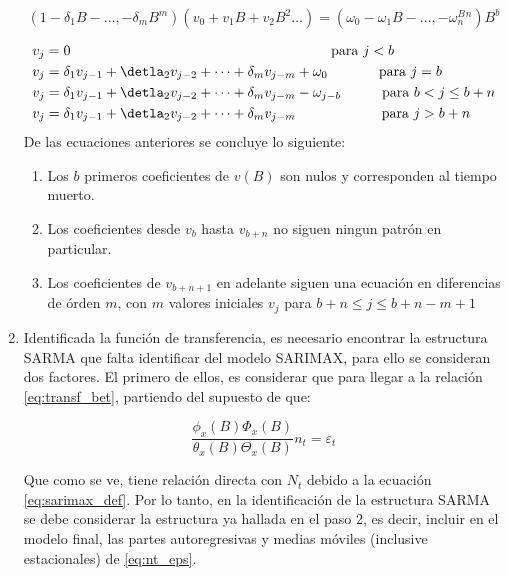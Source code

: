 \documentclass[12pt,oneside]{book}\usepackage[]{graphicx}\usepackage[]{color}
\theoremstyle{definition} %
\begin{document}
\begin{enumerate}
$$(1-\delta_1B-\dots,-\delta_mB^m) (v_0+v_1B+v_2B^2\dots)= (\omega_0-\omega_1B-\dots,-\omega_n^B^n)B^b$$

\begin{equation} 
\begin{split}
v_j & = 0  \text{ \phantom{aaaaaaaaaaaaaaaaaaaaaaaaaaaaaaaaaaaa} para } j<b\\
v_j & = \delta_1v_{j-1}+\detla_2 v_{j-2} + \dots +\delta_m v_{j-m} + \omega_0  \text{ \phantom{aaaaaa} para } j=b\\
v_j & = \delta_1v_{j-1}+\detla_2 v_{j-2} + \dots +\delta_m v_{j-m} - \omega_{j-b}  \text{ \phantom{aaaa.} para } b < j\leq b+n\\
v_j & = \delta_1v_{j-1}+\detla_2 v_{j-2} + \dots +\delta_m v_{j-m}  \text{ \phantom{aaaaaaaaaaa} para } j>b+n\\
\end{split}
\end{equation}
De las ecuaciones anteriores se concluye lo siguiente:
\begin{enumerate}
\item Los $b$ primeros coeficientes de $v(B)$ son nulos y corresponden al tiempo muerto.
\item Los coeficientes desde $v_b$ hasta $v_{b+n}$ no siguen ningun patrón en particular.
\item Los coeficientes de $v_{b+n+1}$ en adelante siguen una ecuación en diferencias de órden $m$, con $m$ valores iniciales $v_j$ para $b+n\leq j\leq b+n-m+1$

\end{enumerate}

\item Identificada la función de transferencia, es necesario encontrar la estructura SARMA que falta identificar del modelo SARIMAX, para ello se consideran dos factores. El primero de ellos, es considerar que para llegar a la relación \ref{eq:transf_bet}, partiendo del supuesto de que:

\begin{equation}\label{eq:nt_eps}
 \frac{ \phi_x(B) \Phi_x(B)}{\theta_x(B) \Theta_x(B)} n_t = \varepsilon_t 
\end{equation}

Que como se ve, tiene relación directa con $N_t$ debido a la ecuación \ref{eq:sarimax_def}. Por lo tanto, en la identificación de la estructura SARMA se debe considerar la estructura ya hallada en el paso 2, es decir, incluir en el modelo final, las partes autoregresivas y medias móviles (inclusive estacionales) de \ref{eq:nt_eps}.


\end{enumerate}
\end{document}
